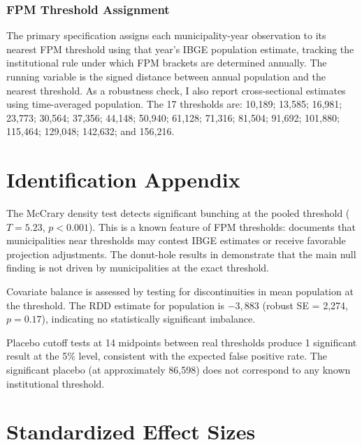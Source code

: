 \documentclass[12pt]{article}
\begin{document}
\subsubsection*{FPM Threshold Assignment} The primary specification assigns each municipality-year observation to its nearest FPM threshold using that year's IBGE population estimate, tracking the institutional rule under which FPM brackets are determined annually. The running variable is the signed distance between annual population and the nearest threshold. As a robustness check, I also report cross-sectional estimates using time-averaged population. The 17 thresholds are: 10,189; 13,585; 16,981; 23,773; 30,564; 37,356; 44,148; 50,940; 61,128; 71,316; 81,504; 91,692; 101,880; 115,464; 129,048; 142,632; and 156,216.

\section{Identification Appendix}

The McCrary density test detects significant bunching at the pooled threshold ($T = 5.23$, $p < 0.001$). This is a known feature of FPM thresholds: \citet{litschig2012internal} documents that municipalities near thresholds may contest IBGE estimates or receive favorable projection adjustments. The donut-hole results in  demonstrate that the main null finding is not driven by municipalities at the exact threshold.

Covariate balance is assessed by testing for discontinuities in mean population at the threshold. The RDD estimate for population is $-3,883$ (robust SE = 2,274, $p = 0.17$), indicating no statistically significant imbalance.

Placebo cutoff tests at 14 midpoints between real thresholds produce 1 significant result at the 5\% level, consistent with the expected false positive rate. The significant placebo (at approximately 86,598) does not correspond to any known institutional threshold.

\section{Standardized Effect Sizes}
\label{sec:sde}


\end{document}
